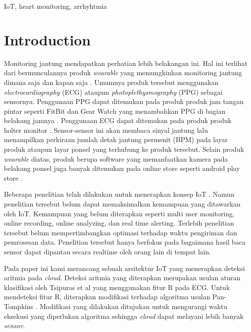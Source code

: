 \documentclass[conference]{IEEEtran}
\begin{document}
\bigskip
\begin{IEEEkeywords}
IoT, heart monitoring, arrhyhtmia
\end{IEEEkeywords}

\section{Introduction}
Monitoring jantung mendapatkan perhatian lebih belakangan ini. Hal ini terlihat dari bermunculannya produk \textit{wearable} yang memungkinkan monitoring jantung dimana saja dan kapan saja \cite{online:fitbit, online:samsung_gear, online:endo_holter}. Umumnya produk tersebut menggunakan \textit{electrocardiography} (ECG) ataupun \textit{photoplethysmography} (PPG) sebagai sensornya. Penggunaan PPG dapat ditemukan pada produk produk jam tangan pintar seperti FitBit dan Gear Watch yang menambahkan PPG di bagian belakang jamnya \cite{online:fitbit, online:samsung_gear}. Penggunaan ECG dapat ditemukan pada produk produk holter monitor \cite{online:endo_holter}. Sensor-sensor ini akan membaca sinyal jantung lalu menampilkan perkiraan jumlah detak jantung permenit (BPM) pada layar produk ataupun layar ponsel yang terhubung ke produk tersebut. Selain produk \textit{wearable} diatas, produk berupa software yang memanfaatkan kamera pada belakang ponsel juga banyak ditemukan pada online store seperti android play store \cite{playstore_heart}.

Beberapa penelitian telah dilakukan untuk menerapkan konsep IoT \cite{daniel_barataa, paola_pierleoni, vasu_jindal, mamidi}. Namun penelitian tersebut belum dapat memaksimalkan kemampuan yang ditawarkan oleh IoT. Kemampuan yang belum diterapkan seperti multi user monitoring, online recording, online analyzing, dan real time alerting. Terlebih penelitian tersebut belum mempertimbangkan optimasi terhadap waktu pengiriman dan pemrosesan data. Penelitian tersebut hanya berfokus pada bagaimana hasil baca sensor dapat dipantau secara realtime oleh orang lain di tempat lain.

Pada paper ini kami merancang sebuah arsitektur IoT yang menerapkan deteksi aritmia pada \textit{cloud}. Deteksi aritmia yang diterapkan merupakan usulan aturan klasifikasi oleh Tsipuras et al \cite{tsipouras} yang menggunakan fitur R pada ECG. Untuk mendeteksi fitur R, diterapkan modifikasi terhadap algoritma usulan Pan-Tompkins \cite{pantom}. Modifikasi yang dilakukan ditujukan untuk mengurangi waktu eksekusi yang diperlukan algoritma sehingga \textit{cloud} dapat melayani lebih banyak \textit{sensor}.
\end{document}
